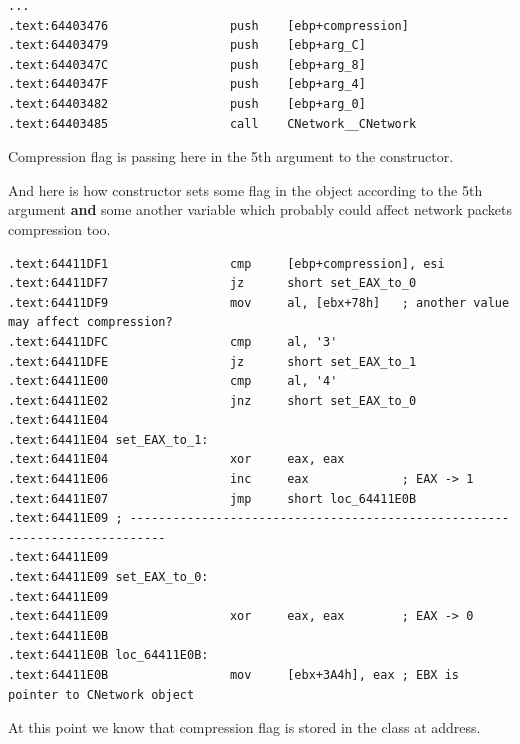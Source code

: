\begin{lstlisting}
...
.text:64403476                 push    [ebp+compression]
.text:64403479                 push    [ebp+arg_C]
.text:6440347C                 push    [ebp+arg_8]
.text:6440347F                 push    [ebp+arg_4]
.text:64403482                 push    [ebp+arg_0]
.text:64403485                 call    CNetwork__CNetwork
\end{lstlisting}

{Compression flag is passing here in the 5th argument to the  constructor.}

{And here is how  constructor sets some flag in the  object according to the 5th argument \textbf{and}
some another variable which probably could affect network packets compression too.}

\begin{lstlisting}
.text:64411DF1                 cmp     [ebp+compression], esi
.text:64411DF7                 jz      short set_EAX_to_0
.text:64411DF9                 mov     al, [ebx+78h]   ; another value may affect compression?
.text:64411DFC                 cmp     al, '3'
.text:64411DFE                 jz      short set_EAX_to_1
.text:64411E00                 cmp     al, '4'
.text:64411E02                 jnz     short set_EAX_to_0
.text:64411E04
.text:64411E04 set_EAX_to_1:
.text:64411E04                 xor     eax, eax
.text:64411E06                 inc     eax             ; EAX -> 1
.text:64411E07                 jmp     short loc_64411E0B
.text:64411E09 ; ---------------------------------------------------------------------------
.text:64411E09
.text:64411E09 set_EAX_to_0:
.text:64411E09
.text:64411E09                 xor     eax, eax        ; EAX -> 0
.text:64411E0B
.text:64411E0B loc_64411E0B:
.text:64411E0B                 mov     [ebx+3A4h], eax ; EBX is pointer to CNetwork object
\end{lstlisting}

{At this point we know that compression flag is stored in the  class at  address.}

